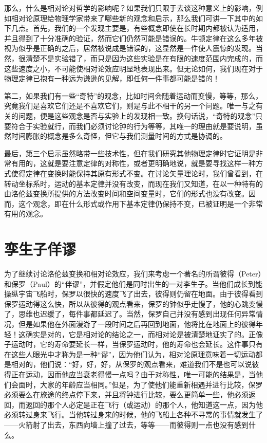 那么，什么是相对论对哲学的影响呢？如果我们只限于去谈这种意义上的影响，例如相对论原理给物理学家带来了哪些新的观念和启示，那么我们可讲一下其中的如下几点。首先，我们的一个发现主要是，有些概念即使在长时期内都被认为适用，并且得到了十分准确的验证，然而它们仍然可能是错误的。牛顿定律在这么多年被视为似乎是正确的之后，居然被说成是错误的，这显然是一件使人震惊的发现。当然，很清楚不是实验错了，而只是因为这些实验是在有限的速度范围内完成的，而这些速度之小，不可能使相对论效应明显地表现出来。但无论如何，我们现在对于物理定律已抱有一种远为谦逊的见解，即任何一件事都可能是错的！

第二，如果我们有一些“奇特”的观念，比如时间会随着运动而变慢，等等，那么，究竟我们是喜欢它们还是不喜欢它们，则是与此不相干的另一个问题。唯一与之有关的问题，便是这些观念是否与实验上的发现相一致。换句话说，“奇特的观念”只要符合于实验就行，而我们必须讨论钟的行为等等，其唯一的理由就是要说明，虽然时间膨胀的概念是多么奇怪，但它与我们测量时间的方式是协调的。

最后，第三个启示虽然略带一些技术性，但在我们研究其他物理定律时它证明是非常有用的，这就是要注意定律的对称性，或者更明确地说，就是要寻找这样一种方式使得定律在变换时能保持其原有形式不变。在讨论矢量理论时，我们曾看到，在转动坐标系时，运动的基本定律并没有改变，而现在我们又知道，在以一种特有的由洛伦兹变换所提供的方法改变时间和空间变量时，它们的形式也没有改变。因而，这个观念，即在什么形式或作用下基本定律仍保持不变，已被证明是一个非常有用的观念。

\section{孪生子佯谬}

为了继续讨论洛伦兹变换和相对论效应，我们来考虑一个著名的所谓彼得（Peter）和保罗（Paul）的“伴谬”，并假定他们是同时出生的一对李生子。当他们成长到能操纵宇宙飞船时，保罗以很快的速度飞了出去，彼得则仍留在地面。由于彼得看到保罗运动得这么快，所以从彼得的观点看来，保罗的钟似乎走慢了，他的心跳变慢了，思维也迟缓了，每件事都延迟了。当然，保罗自己并没有感到出现任何异常情况，但是如果他在外面漫游了一段时间之后再回到地面，他将比在地面上的彼得年轻！这确实是对的，它是相对论的结论之一，而相对论是被清楚地证实了的。正像子运动时，它的寿命要延长一样，当保罗运动时，他的寿命也会延长。这件事只有在这些人眼光中才称为是一种“谬”，因为他们认为，相对论原理意味着一切运动都是相对的，他们说：“好，好，好，从保罗的观点看来，难道我们不是也可以说彼得正在运动，因而他应当衰老得慢一点吗？由于对称性，唯一可能的结果是，当他们会面时，大家的年龄应当相同。”但是，为了使他们能重新相遇并进行比较，保罗必须要么在旅途的终点停下来，并且将钟进行比较，要么更简单一些，他必须返回，而返回的那个人必定是正在飞行（或运动）的那个人，他知道这一点，因为他必须转过身来飞行。当他转过身来的时候，他的飞船上各种不寻常的事情就发生了——火箭射了出去，东西向墙上撞了过去，等等——而彼得则一点也没有感到什么。

